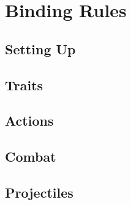 \section*{Binding Rules}

\begin{multicols}{2}

\subsection*{Setting Up}



\subsection*{Traits}





\subsubsection*{}




\physicalSkillChart

\subsection*{Actions}








\subsection*{Combat}





\commonWeaponsChart

\subsection*{Projectiles}




\end{multicols}
